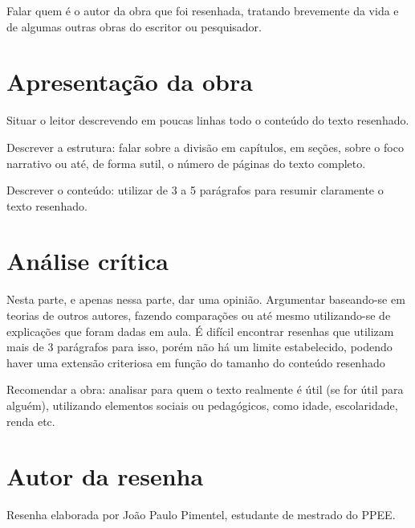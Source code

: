 \documentclass[11pt]{article}
\begin{document}
Falar quem é o autor da obra que foi resenhada, tratando brevemente da vida e de algumas outras obras do escritor ou pesquisador.

\section{Apresentação da obra}
Situar o leitor descrevendo em poucas linhas todo o conteúdo do texto resenhado.

Descrever a estrutura: falar sobre a divisão em capítulos, em seções, sobre o foco narrativo ou até, de forma sutil, o número de páginas do texto completo.

Descrever o conteúdo: utilizar de 3 a 5 parágrafos para resumir claramente o texto resenhado.

\section{Análise crítica}
Nesta parte, e apenas nessa parte, dar uma opinião. Argumentar baseando-se em teorias de outros autores, fazendo comparações ou até mesmo utilizando-se de explicações que foram dadas em aula. É difícil encontrar resenhas que utilizam mais de 3 parágrafos para isso, porém não há um limite estabelecido, podendo haver uma extensão criteriosa em função do tamanho do conteúdo resenhado

Recomendar a obra: analisar para quem o texto realmente é útil (se for útil para alguém), utilizando elementos sociais ou pedagógicos, como idade, escolaridade, renda etc.

\section{Autor da resenha}
Resenha elaborada por João Paulo Pimentel, estudante de mestrado do PPEE. 



\end{document}
